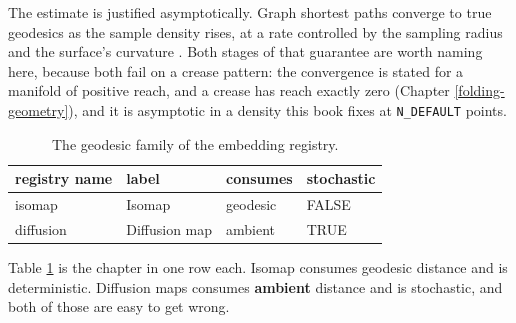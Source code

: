 \documentclass[
  british,
  a4paper,
]{book}
\newenvironment{Shaded}{\begin{snugshade}}{\end{snugshade}}
\newcommand{\AttributeTok}[1]{\textcolor[rgb]{0.13,0.29,0.53}{#1}}
\newcommand{\ConstantTok}[1]{\textcolor[rgb]{0.56,0.35,0.01}{#1}}
\newcommand{\FunctionTok}[1]{\textcolor[rgb]{0.13,0.29,0.53}{\textbf{#1}}}
\newcommand{\NormalTok}[1]{#1}
\newcommand{\OtherTok}[1]{\textcolor[rgb]{0.56,0.35,0.01}{#1}}
\newcommand{\SpecialCharTok}[1]{\textcolor[rgb]{0.81,0.36,0.00}{\textbf{#1}}}
\newcommand{\StringTok}[1]{\textcolor[rgb]{0.31,0.60,0.02}{#1}}
\begin{document}
The estimate is justified asymptotically. Graph shortest paths converge to true
geodesics as the sample density rises, at a rate controlled by the sampling
radius and the surface's curvature \citep{bernstein2000graph}. Both stages of that
guarantee are worth naming here, because both fail on a crease pattern: the
convergence is stated for a manifold of positive reach, and a crease has reach
exactly zero (Chapter \ref{folding-geometry}), and it is asymptotic in a
density this book fixes at \texttt{N\_DEFAULT} points.

\begin{Shaded}
\end{Shaded}

\begin{table}

\caption{\label{tab:geo-registry}The geodesic family of the embedding registry.}
\centering
\begin{tabular}[t]{l|l|l|l}
\hline
registry name & label & consumes & stochastic\\
\hline
isomap & Isomap & geodesic & FALSE\\
\hline
diffusion & Diffusion map & ambient & TRUE\\
\hline
\end{tabular}
\end{table}

Table \ref{tab:geo-registry} is the chapter in one row each. Isomap consumes
geodesic distance and is deterministic. Diffusion maps consumes \textbf{ambient}
distance and is stochastic, and both of those are easy to get wrong.
\end{document}
